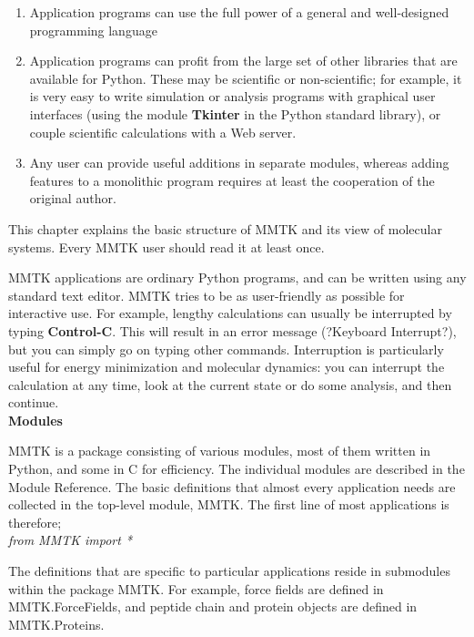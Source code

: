 \documentclass{article}
\newcounter{subsubsubsection}[subsubsection]
\begin{document}
\begin{enumerate}
   \item Application programs can use the full power of a general and
well-designed programming language
   \item Application programs can profit from the large set of other libraries that are available for Python.  These may be scientific or non-scientific; for example, it is very easy to write simulation or analysis programs with graphical user interfaces (using the module \textbf{Tkinter} in the Python standard library), or couple scientific calculations with a Web server.
   \item Any user can provide useful additions in separate modules, whereas adding features to a monolithic program requires at least the cooperation of the original author.
\end{enumerate}


This chapter explains the basic structure of MMTK and its view of
molecular systems.  Every MMTK user should read it at least once.

MMTK applications are ordinary Python programs, and can be written
using any standard text editor. MMTK tries to be as user-friendly as possible for interactive use.  For example, lengthy calculations can usually be interrupted by typing \textbf{Control-C}. This will result in an error message (?Keyboard Interrupt?), but you can simply go on typing other commands.  Interruption is particularly useful for energy minimization and molecular dynamics:  you can interrupt the calculation at any time, look at the current state or do some analysis, and then continue. \\

\textbf{Modules}

MMTK is a package consisting of various modules, most of them written in Python, and some in C for efficiency.  The individual modules are described in the Module Reference.  The basic definitions that almost every application needs are collected in the top-level module, MMTK. The first line of most applications is therefore; \\

\textit{from MMTK import *}

The definitions that are specific to particular applications reside in submodules within the package MMTK. For example, force fields are defined in MMTK.ForceFields, and peptide chain and protein objects are defined in MMTK.Proteins.
\end{document}
